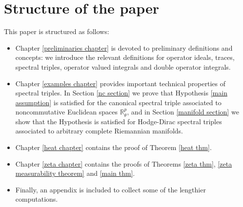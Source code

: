 \section{Structure of the paper}
    This paper is structured as follows:
    \begin{itemize}
        \item{} Chapter \ref{preliminaries chapter} is devoted to preliminary definitions and concepts: we introduce the relevant definitions for operator ideals, traces, spectral
                triples, operator valued integrals and double operator integrals.
        \item{} Chapter \ref{examples chapter} provides important technical properties of spectral triples. In Section \ref{nc section} we prove that Hypothesis \ref{main assumption}
                is satisfied for the canonical spectral triple associated to noncommutative Euclidean spaces $\mathbb{R}^p_\theta$, and in Section \ref{manifold section} we show
                that the Hypothesis is satisfied for Hodge-Dirac spectral triples associated to arbitrary complete Riemannian manifolds.
        \item{} Chapter \ref{heat chapter} contains the proof of Theorem \ref{heat thm}.
        \item{} Chapter \ref{zeta chapter} contains the proofs of Theorems \ref{zeta thm}, \ref{zeta measurability theorem} and \ref{main thm}.
        \item{} Finally, an appendix is included to collect some of the lengthier computations.
    \end{itemize}
% 
% 
% 
